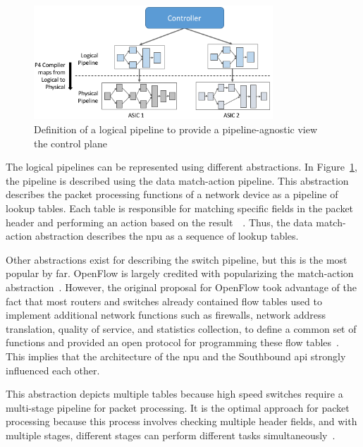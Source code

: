 \begin{figure}
	\centering
	\includegraphics[width=0.8\textwidth]{Chapters/Figures/SDNs/pipeline_abstraction.png}
	\caption{Definition of a logical pipeline to provide a pipeline-agnostic view the control plane~\cite{peterson_software-defined_2021}}
	\label{fig:pipeline_abstraction}
\end{figure}


The logical pipelines can be represented using different abstractions. In Figure~\ref{fig:pipeline_abstraction}, the pipeline is described using the data match-action pipeline. This abstraction describes the packet processing functions of a network device as a pipeline of lookup tables. Each table is responsible for matching specific fields in the packet header and performing an action based on the result~\cite{bifulco_survey_2018}~\cite{kreutz_software-defined_2015}. Thus, the data match-action abstraction describes the \gls{npu} as a sequence of lookup tables. 

Other abstractions exist for describing the switch pipeline, but this is the most popular by far. OpenFlow is largely credited with popularizing the match-action abstraction~\cite{bifulco_survey_2018}. However, the original proposal for OpenFlow took advantage of the fact that most routers and switches already contained flow tables used to implement additional network functions such as firewalls, network address translation, quality of service, and statistics collection, to define a common set of functions and provided an open protocol for programming these flow tables~\cite{mckeown_openflow_2008}. This implies that the architecture of the \gls{npu} and the Southbound \gls{api} strongly influenced each other.

This abstraction depicts multiple tables because high speed switches require a multi-stage pipeline for packet processing. It is the optimal approach for packet processing because this process involves checking multiple header fields, and with multiple stages, different stages can perform different tasks simultaneously~\cite{peterson_software-defined_2021}. 

